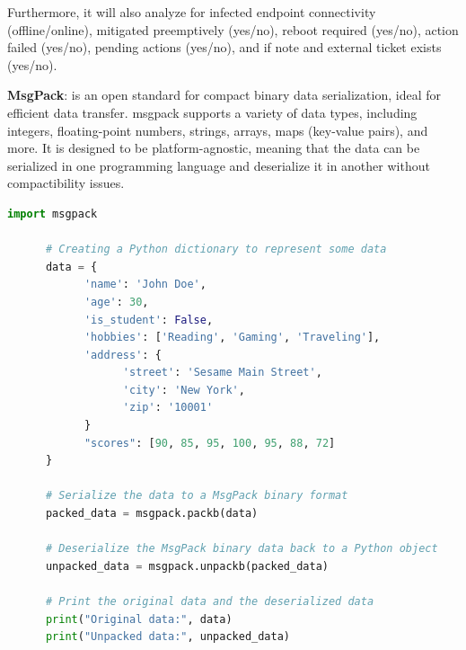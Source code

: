 \begin{multicols}{2}
      Furthermore, it will also analyze for infected endpoint connectivity (offline/online), mitigated preemptively (yes/no),
      reboot required (yes/no), action failed (yes/no), pending actions (yes/no), and if note and external ticket exists (yes/no).

      \begin{multicols}{2}
            \textbf{MsgPack}: is an open standard for compact binary data serialization, ideal for efficient data transfer.
            \acrshort{msgpack} supports a variety of data types, including integers, floating-point numbers, strings,
            arrays, maps (key-value pairs), and more. It is designed to be platform-agnostic, meaning that the data can be
            serialized in one programming language and deserialize it in another without compactibility issues.
      \end{multicols}

      \begin{lstlisting}[language=Python, caption=MsgPack Serialization and Deserialization in Python]
      import msgpack

      # Creating a Python dictionary to represent some data
      data = {
            'name': 'John Doe',
            'age': 30,
            'is_student': False,
            'hobbies': ['Reading', 'Gaming', 'Traveling'],
            'address': {
                  'street': 'Sesame Main Street',
                  'city': 'New York',
                  'zip': '10001'
            }
            "scores": [90, 85, 95, 100, 95, 88, 72]
      }

      # Serialize the data to a MsgPack binary format
      packed_data = msgpack.packb(data)

      # Deserialize the MsgPack binary data back to a Python object
      unpacked_data = msgpack.unpackb(packed_data)

      # Print the original data and the deserialized data
      print("Original data:", data)
      print("Unpacked data:", unpacked_data)
\end{lstlisting}

\end{multicols}

